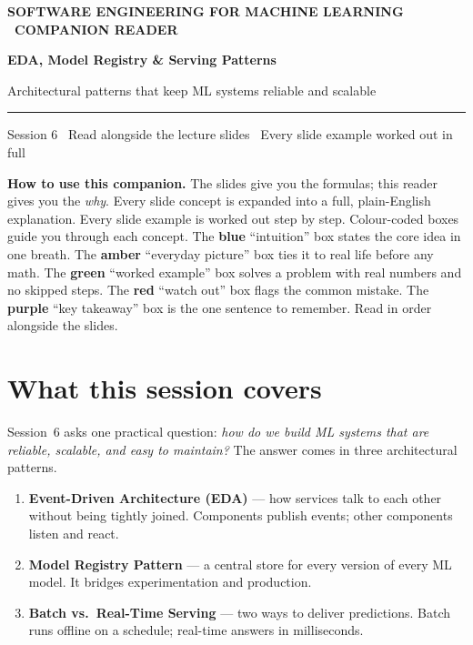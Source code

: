 \documentclass[a4paper,11pt]{article}
\providecommand{\addfontfeatureslike}[1]{#1}
\newcommand{\titlebanner}[4]{%
  \begin{tcolorbox}[
    enhanced, breakable=false,
    colback=navy, colframe=navy,
    boxrule=0pt, arc=3pt, outer arc=3pt,
    left=16pt, right=16pt, top=16pt, bottom=16pt,
    before skip=2pt, after skip=14pt,
    width=\linewidth ]
    {\sffamily\footnotesize\bfseries\color{white!85}%
      \MakeUppercase{\addfontfeatureslike{#1}}}\par
    \vspace{6pt}
    {\sffamily\bfseries\fontsize{30}{34}\selectfont\color{white} #2\par}
    \vspace{5pt}
    {\sffamily\large\color{white!88} #3\par}
    \vspace{9pt}
    {\color{white!55}\rule{\linewidth}{0.4pt}}\par
    \vspace{6pt}
    {\sffamily\footnotesize\color{white!82} #4\par}
  \end{tcolorbox}%
}
\begin{document}

\thispagestyle{fancy}

\titlebanner
  {Software Engineering for Machine Learning \textperiodcentered\ Companion Reader}
  {EDA, Model Registry \& Serving Patterns}
  {Architectural patterns that keep ML systems reliable and scalable}
  {Session 6 \textperiodcentered\ Read alongside the lecture slides \textperiodcentered\ Every slide example worked out in full}

\noindent\textbf{How to use this companion.}
The slides give you the formulas; this reader gives you the \emph{why}.
Every slide concept is expanded into a full, plain-English explanation.
Every slide example is worked out step by step.
Colour-coded boxes guide you through each concept.
The \textcolor{intuFrame}{\textbf{blue}} ``intuition'' box states the core idea
in one breath.
The \textcolor{everyFrame}{\textbf{amber}} ``everyday picture'' box ties it to
real life before any math.
The \textcolor{workFrame}{\textbf{green}} ``worked example'' box solves a
problem with real numbers and no skipped steps.
The \textcolor{watchFrame}{\textbf{red}} ``watch out'' box flags the common
mistake.
The \textcolor{keyFrame}{\textbf{purple}} ``key takeaway'' box is the one
sentence to remember. Read in order alongside the slides.

\medskip

\section{What this session covers}

Session~6 asks one practical question: \emph{how do we build ML systems that
are reliable, scalable, and easy to maintain?}
The answer comes in three architectural patterns.

\begin{enumerate}
  \item \textbf{Event-Driven Architecture (EDA)} --- how services talk to each
        other without being tightly joined. Components publish events; other
        components listen and react.
  \item \textbf{Model Registry Pattern} --- a central store for every version
        of every ML model. It bridges experimentation and production.
  \item \textbf{Batch vs.\ Real-Time Serving} --- two ways to deliver
        predictions. Batch runs offline on a schedule; real-time answers in
        milliseconds.
\end{enumerate}
\end{document}
